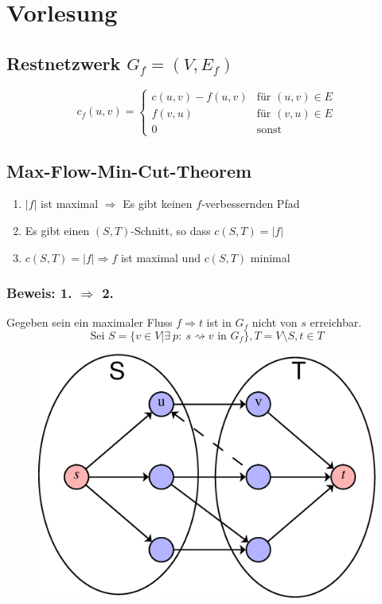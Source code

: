 \chapter{Vorlesung}
\section{Restnetzwerk $G_f=(V,E_f)$}
\[ c_f(u,v)=\begin{cases}
c(u,v)-f(u,v)&\text{für }(u,v)\in E\\
f(v,u)&\text{für }(v,u)\in E\\
0 & \text{sonst}
\end{cases} \]
\section{Max-Flow-Min-Cut-Theorem}
\begin{enumerate}
	\item $|f|$ ist maximal $\Rightarrow$ Es gibt keinen $f$-verbessernden Pfad
	\item Es gibt einen $(S,T)$-Schnitt, so dass $c(S,T)=|f|$
	\item $c(S,T) = |f| \Rightarrow f$ ist maximal und $c(S,T)$ minimal
\end{enumerate}
\subsection{Beweis: 1. $\Rightarrow$ 2.}
Gegeben sein ein maximaler Fluss $f\Rightarrow  t$ ist in $G_f$ nicht von $s$ erreichbar.
\[ \text{Sei }S=\{ v\in V | \exists~p:~s \rightsquigarrow v \text{ in } G_f \}, T=V\setminus S, t \in T \]
\begin{figure}
	\centering
	\includegraphics[width=\linewidth]{25/Grafik/Diagramm2}
	\caption{}
\end{figure}

